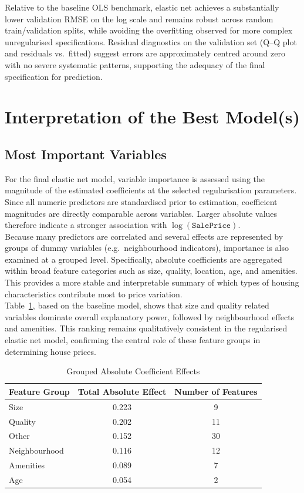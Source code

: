 \documentclass[12pt,oneside]{article} %
\begin{document}
Relative to the baseline OLS benchmark, elastic net achieves a substantially lower validation RMSE on the log scale and remains robust across random train/validation splits, while avoiding the overfitting observed for more complex unregularised specifications. Residual diagnostics on the validation set (Q--Q plot and residuals vs.\ fitted) suggest errors are approximately centred around zero with no severe systematic patterns, supporting the adequacy of the final specification for prediction.


\section{Interpretation of the Best Model(s)}

\subsection{Most Important Variables}

For the final elastic net model, variable importance is assessed using the magnitude of the estimated coefficients at the selected regularisation parameters. Since all numeric predictors are standardised prior to estimation, coefficient magnitudes are directly comparable across variables. Larger absolute values therefore indicate a stronger association with $\log(\texttt{SalePrice})$.\\

\noindent
Because many predictors are correlated and several effects are represented by groups of dummy variables (e.g.\ neighbourhood indicators), importance is also examined at a grouped level. Specifically, absolute coefficients are aggregated within broad feature categories such as size, quality, location, age, and amenities. This provides a more stable and interpretable summary of which types of housing characteristics contribute most to price variation.\\

\noindent
Table~\ref{tab:coef_groups}, based on the baseline model, shows that size and quality related variables dominate overall explanatory power, followed by neighbourhood effects and amenities. This ranking remains qualitatively consistent in the regularised elastic net model, confirming the central role of these feature groups in determining house prices.

\begin{table}[H]
\centering
\caption{Grouped Absolute Coefficient Effects}
\label{tab:coef_groups}
\begin{tabular}{lcc}
\toprule
\textbf{Feature Group} & \textbf{Total Absolute Effect} & \textbf{Number of Features} \\
\midrule
Size         & 0.223 & 9  \\
Quality      & 0.202 & 11 \\
Other        & 0.152 & 30 \\
Neighbourhood & 0.116 & 12 \\
Amenities    & 0.089 & 7  \\
Age          & 0.054 & 2  \\
\bottomrule
\end{tabular}
\end{table}
\end{document}

